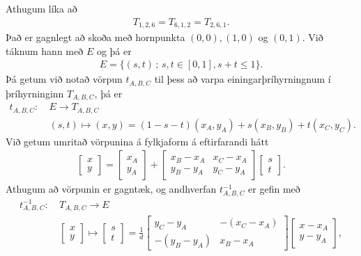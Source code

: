 \documentclass[a4paper,10pt,icelandic]{sphinxmanual}
\begin{document}
Athugum líka að
\begin{equation*}
\begin{split}T_{1,2,6}=T_{6,1,2}=T_{2,6,1}.\end{split}
\end{equation*}
Það er gagnlegt að skoða  með hornpunkta \((0,0), (1,0)\) og \((0,1)\). Við táknum hann með \(E\) og þá er
\begin{equation*}
\begin{split}E=\{(s,t)\,;\, s,t\in [0,1], s+t\leq 1\}.\end{split}
\end{equation*}
Þá getum við notað vörpun \(t_{A,B,C}\) til þess að varpa einingarþríhyrningnum í þríhyrninginn \(T_{A,B,C}\), þá er
\begin{equation*}
\begin{split}t_{A,B,C}: ~&E \to T_{A,B,C}\\
& (s,t) \mapsto (x,y)=(1-s-t)(x_A,y_A)+s(x_B,y_B)+t(x_{C},y_{C}).\end{split}
\end{equation*}
Við getum umritað vörpunina á fylkjaform á eftirfarandi hátt
\begin{equation}\label{equation:Kafli06:eq.maptriangle}
\begin{split}\left[\begin{matrix} x \\ y  \end{matrix}\right]
=
\left[\begin{matrix} x_A \\ y_A  \end{matrix}\right]+
\left[\begin{matrix}   x_B-x_A & x_C-x_A
\\ y_B-y_A & y_C-y_A
\end{matrix}\right]
\left[\begin{matrix}   s\\ t \end{matrix}\right].\end{split}
\end{equation}
Athugum að vörpunin er gagntæk, og andhverfan \(t^{-1}_{A,B,C}\) er gefin með
\begin{equation*}
\begin{split}t^{-1}_{A,B,C}: ~&T_{A,B,C} \to E\\
& \left[\begin{matrix}   x\\ y \end{matrix}\right] \mapsto  \left[\begin{matrix}   s\\ t \end{matrix}\right]
=
\frac{1}{d}\left[\begin{matrix}   y_C-y_A & -(x_C-x_A)
\\ -(y_B-y_A) & x_B-x_A
\end{matrix}\right]
\left[\begin{matrix}   x-x_A\\ y-y_A \end{matrix}\right],\end{split}
\end{equation*}
\end{document}
